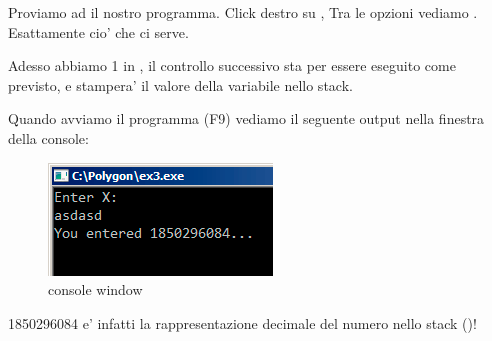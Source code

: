 Proviamo ad  il nostro programma.
Click destro su \EAX, 
Tra le opzioni vediamo .
Esattamente cio' che ci serve.

Adesso abbiamo 1 in \EAX, il controllo successivo sta per essere eseguito come previsto,
e \printf stampera' il valore della variabile nello stack.

Quando avviamo il programma (F9) vediamo il seguente output nella finestra della console:

\begin{figure}[H]
\centering
\includegraphics[scale=\FigScale]{patterns/04_scanf/3_checking_retval/olly_3.png}
\caption{console window}
\end{figure}

1850296084 e' infatti la rappresentazione decimale del numero nello stack ()!
